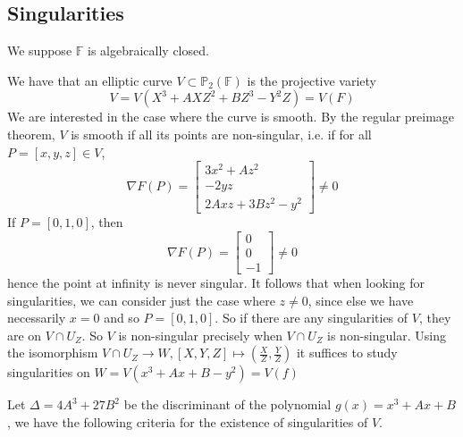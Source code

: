 \documentclass{article}
\theoremstyle{definition}
\theoremstyle{remark}
\newcommand{\proj}{\mathbb{P}}
\newcommand{\F}{\mathbb{F}}
\begin{document}
\subsection{Singularities}

We suppose $\F$ is algebraically closed.
	
We have that an elliptic curve $V \subset \proj_2(\F)$
is the projective variety
\begin{equation}
	V = V(X^3 + AXZ^2 + BZ^3 - Y^2Z) = V(F)
\end{equation}
We are interested in the case where the curve is smooth.
By the regular preimage theorem, $V$ is smooth if all its points
are non-singular, i.e. if for all $P = [x, y, z] \in V$,
\begin{equation*}
	\nabla F(P) = 
	\begin{bmatrix}
		3x^2 + Az^2\\
		-2yz\\
		2Axz + 3Bz^2 - y^2
	\end{bmatrix}
	\neq 0
\end{equation*}
If $P = [0, 1, 0]$, then 
\begin{equation*}
	\nabla F(P) = 
	\begin{bmatrix}
		0\\
		0\\
		-1
	\end{bmatrix} \neq 0
\end{equation*}
hence the point at infinity is never singular. It follows
that when looking for singularities, we can consider just
the case where $z \neq 0$, since else we have necessarily $x = 0$
and so $P = [0, 1, 0]$. So if there are any singularities of $V$,
they are on $V \cap U_Z$. So $V$ is non-singular precisely when
$V \cap U_Z$ is non-singular. Using the isomorphism
$V \cap U_Z \to W, [X, Y, Z] \mapsto (\frac{X}{Z}, \frac{Y}{Z})$ it
suffices to study singularities on $W = V(x^3 + Ax + B - y^2)
= V(f)$

Let $\Delta = 4A^3 + 27B^2$ be the discriminant of the polynomial
$g(x) = x^3 + Ax + B$, we have the following criteria for the
existence of singularities of $V$.
\end{document}
